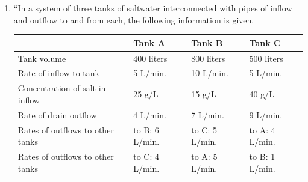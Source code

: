 \documentclass[11pt]{article}
\begin{document}
	\begin{enumerate}
		\item ``In a system of three tanks of saltwater interconnected with pipes of inflow and outflow to and from each, the following information is given.

			\begin{table}[htbp]\centering
  				\begin{tabular}{|l|l|l|l|}
    					\hline
          					& Tank A & Tank B & Tank C \\
    					\hline
   						 Tank volume & 400 liters & 800 liters & 500 liters \\
   					 \hline
  					  	Rate of inflow
						to tank & 5 L/min. & 10 L/min. & 5 L/min. \\
    					\hline
    						Concentration of 
						salt in inflow & 25 g/L & 15 g/L & 40 g/L \\
    					\hline
    						Rate of drain outflow & 4 L/min. & 7 L/min. & 9 L/min. \\
   					\hline
						Rates of outflows 
						to other tanks & to B: 6 L/min. & to C: 5 L/min. & to A: 4 L/min. \\
    					\hline
    						Rates of outflows 
						to other tanks & to C: 4 L/min. & to A: 5 L/min. & to B: 1 L/min. \\
    					\hline
    				\end{tabular}
			\end{table}
			

\end{enumerate}
\end{document}
